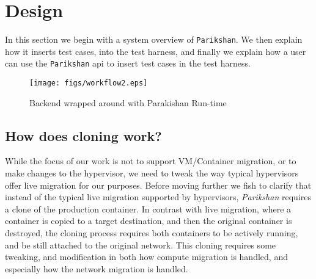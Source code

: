 
\section{Design}
\label{sec:design}

In this section we begin with a system overview of \texttt{Parikshan}. 
We then explain how it inserts test cases, into the test harness, and finally we explain how a user can use the \texttt{Parikshan} api to insert test cases in the test harness.

\begin{figure*}[t]
  \begin{center}
    \texttt{[image: figs/workflow2.eps]}
    \caption{Backend wrapped around with Parakishan Run-time}
    \label{fig:workflow}
  \end{center}
\end{figure*}

\subsection{How does cloning work?}

While the focus of our work is not to support VM/Container migration, or to make changes to the hypervisor, we need to tweak the way typical hypervisors offer live migration for our purposes.
Before moving further we fish to clarify that instead of the typical live migration supported by hypervisors, \textit{Parikshan} requires a clone of the production container. 
In contrast with live migration, where a container is copied to a target destination, and then the original container is destroyed, the cloning process requires both containers to be actively running, and be still attached to the original network.
This cloning requires some tweaking, and modification in both how compute migration is handled, and especially how the network migration is handled. 


